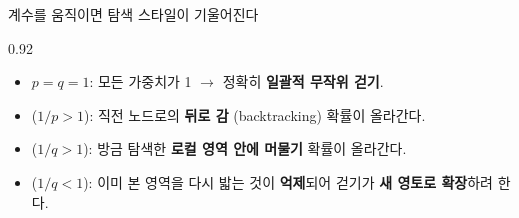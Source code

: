 \begin{frame}{계수를 움직이면 탐색 스타일이 기울어진다}
\begin{center}\begin{varwidth}{0.92\textwidth}
  \begin{itemize}
    \item $p = q = 1$: 모든 가중치가 1 $\to$ 정확히
      \textbf{일괄적 무작위 걷기}.
    \item {} ($1/p > 1$): 직전 노드로의 \textbf{뒤로 감}
      (backtracking) 확률이 올라간다.
    \item {} ($1/q > 1$): 방금 탐색한 \textbf{로컬 영역 안에
      머물기} 확률이 올라간다.
    \item {} ($1/q < 1$): 이미 본 영역을 다시 밟는 것이
      \textbf{억제}되어 걷기가 \textbf{새 영토로 확장}하려 한다.
  \end{itemize}
\end{varwidth}\end{center}
\end{frame}
